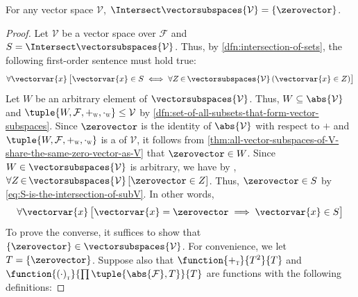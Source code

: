 \begin{thm}
     \label{thm:the-insersection-of-the-set-of-all-vector-subspaces-is-the-singleton-with-only-empty-set-as-its-element}
    For any vector space \( \mathcal{V} \), \( \Intersect \vectorsubspaces{\mathcal{V}} = \mleft\{ \zerovector \mright\} \).
\end{thm}

\begin{proof}
    Let \( \mathcal{V} \) be a vector space over \( \mathcal{F} \) and \( S = \Intersect \vectorsubspaces{\mathcal{V}} \).
    Thus, by \cref{dfn:intersection-of-sets}, the following first-order sentence must hold true:
    \begin{equation}
        \label{eq:S-is-the-intersection-of-subV}
        \forall \vectorvar{x} \, \big[ \vectorvar{x} \in S \iff \forall Z\,{\in}\,\vectorsubspaces{\mathcal{V}} \, \mleft( \vectorvar{x} \in Z \mright) \big]
    \end{equation}
    Let \( W \) be an arbitrary element of \( \vectorsubspaces{\mathcal{V}} \). Thus, \( W \subseteq \abs{\mathcal{V}} \) and
    \( \tuple{W, \mathcal{F}, \smallsubscript{+}{W}, \smallsubscript{\cdot}{W}} \leq \mathcal{V} \) by \cref{dfn:set-of-all-subsets-that-form-vector-subspaces}.
    Since \( \zerovector \) is the identity of \( \abs{\mathcal{V}} \) with respect to \( + \)
    and \( \tuple{W, \mathcal{F}, \smallsubscript{+}{W}, \smallsubscript{\cdot}{W}} \) is a  of \( \mathcal{V} \),
    it follows from \cref{thm:all-vector-subspaces-of-V-share-the-same-zero-vector-as-V} that \( \zerovector \in W \). Since \( W \in \vectorsubspaces{\mathcal{V}} \)
    is arbitrary, we have by ,
    \( \forall Z\,{\in}\,\vectorsubspaces{\mathcal{V}} \, \mleft[ \zerovector \in Z \mright] \).
    Thus, \( \zerovector \in S \) by \eqref{eq:S-is-the-intersection-of-subV}.
    In other words,
    \begin{equation}
        \label{eq:if-x-is-zerovector-then-x-must-be-an-element-of-S}
        \forall \vectorvar{x} \, \big[ \vectorvar{x} = \zerovector \implies \vectorvar{x} \in S \big]
    \end{equation}
    To prove the converse, it suffices to show that \( \mleft\{ \zerovector \mright\} \in \vectorsubspaces{\mathcal{V}} \).
    For convenience, we let \( T = \mleft\{ \zerovector \mright\} \). Suppose also that \( \function{\smallsubscript{+}{T}}{T^{2}}{T} \)
    and \( \function{\smallsubscript{(\cdot)}{T}}{\prod \tuple{\abs{\mathcal{F}}, T}}{T} \) are functions with the following definitions:

\end{proof}

